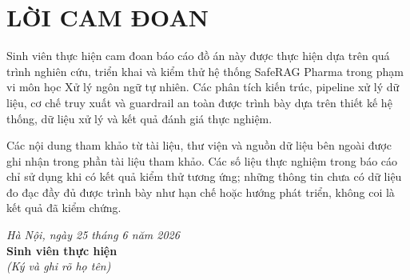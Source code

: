 \chapter*{LỜI CAM ĐOAN}

Sinh viên thực hiện cam đoan báo cáo đồ án này được thực hiện dựa trên quá trình nghiên cứu, triển khai và kiểm thử hệ thống SafeRAG Pharma trong phạm vi môn học Xử lý ngôn ngữ tự nhiên. Các phân tích kiến trúc, pipeline xử lý dữ liệu, cơ chế truy xuất và guardrail an toàn được trình bày dựa trên thiết kế hệ thống, dữ liệu xử lý và kết quả đánh giá thực nghiệm.

Các nội dung tham khảo từ tài liệu, thư viện và nguồn dữ liệu bên ngoài được ghi nhận trong phần tài liệu tham khảo. Các số liệu thực nghiệm trong báo cáo chỉ sử dụng khi có kết quả kiểm thử tương ứng; những thông tin chưa có dữ liệu đo đạc đầy đủ được trình bày như hạn chế hoặc hướng phát triển, không coi là kết quả đã kiểm chứng.

\vspace{1cm}
\begin{flushright}
\textit{Hà Nội, ngày 25 tháng 6 năm 2026}\\[0.6cm]
\textbf{Sinh viên thực hiện}\\
\textit{(Ký và ghi rõ họ tên)}\\[2.4cm]
\end{flushright}
